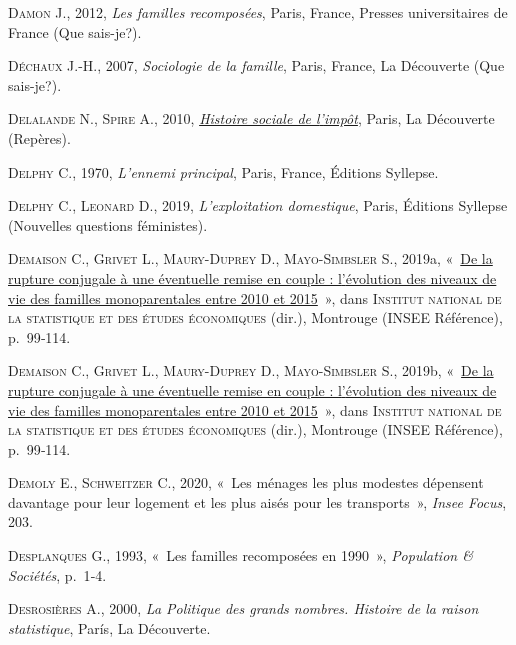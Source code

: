 \documentclass[
  12pt,
]{book}
\newlength{\cslhangindent}
\newenvironment{CSLReferences}[2] %
 {\begin{list}{}{%
  \setlength{\itemindent}{0pt}
  \setlength{\leftmargin}{0pt}
  \setlength{\parsep}{0pt}
  \ifodd #1
   \setlength{\leftmargin}{\cslhangindent}
   \setlength{\itemindent}{-1\cslhangindent}
  \fi
  \setlength{\itemsep}{#2\baselineskip}}}
 {\end{list}}
\begin{document}
\begin{CSLReferences}{0}{1}
\textsc{Damon J.}, 2012, \emph{Les familles recomposées}, Paris, France,
Presses universitaires de France (Que sais-je?).

\textsc{Déchaux J.-H.}, 2007, \emph{Sociologie de la famille}, Paris,
France, La Découverte (Que sais-je?).

\textsc{Delalande N.}, \textsc{Spire A.}, 2010,
\emph{\href{https://www.cairn.info/histoire-sociale-de-l-impot--9782707157164.htm}{Histoire
sociale de l{'}impôt}}, Paris, La Découverte (Repères).

\textsc{Delphy C.}, 1970, \emph{L'ennemi principal}, Paris, France,
Éditions Syllepse.

\textsc{Delphy C.}, \textsc{Leonard D.}, 2019, \emph{L'exploitation
domestique}, Paris, Éditions Syllepse (Nouvelles questions féministes).

\textsc{Demaison C.}, \textsc{Grivet L.}, \textsc{Maury-Duprey D.},
\textsc{Mayo-Simbsler S.}, 2019a,
{«~\href{https://www.insee.fr/fr/statistiques/4238781}{De la rupture
conjugale à une éventuelle remise en couple : l{'}évolution des niveaux
de vie des familles monoparentales entre 2010 et 2015}~»}, dans
\textsc{Institut national de la statistique et des études économiques}
(dir.), Montrouge (INSEE Référence), p.~99‑114.

\textsc{Demaison C.}, \textsc{Grivet L.}, \textsc{Maury-Duprey D.},
\textsc{Mayo-Simbsler S.}, 2019b,
{«~\href{https://www.insee.fr/fr/statistiques/4238781}{De la rupture
conjugale à une éventuelle remise en couple : l{'}évolution des niveaux
de vie des familles monoparentales entre 2010 et 2015}~»}, dans
\textsc{Institut national de la statistique et des études économiques}
(dir.), Montrouge (INSEE Référence), p.~99‑114.

\textsc{Demoly E.}, \textsc{Schweitzer C.}, 2020, {«~Les ménages les
plus modestes dépensent davantage pour leur logement et les plus aisés
pour les transports~»}, \emph{Insee Focus}, 203.

\textsc{Desplanques G.}, 1993, {«~Les familles recomposées en 1990~»},
\emph{Population \& Sociétés}, p.~1‑4.

\textsc{Desrosières A.}, 2000, \emph{La Politique des grands nombres.
Histoire de la raison statistique}, París, La Découverte.


\end{CSLReferences}
\end{document}
